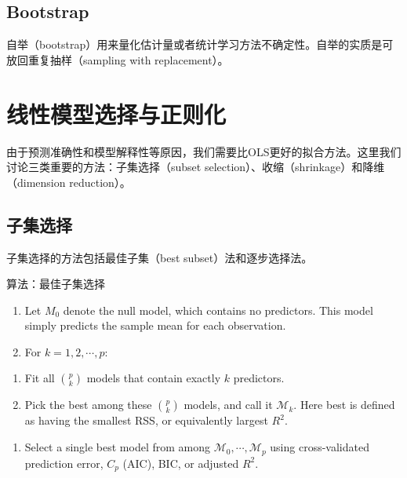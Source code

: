 \documentclass[hyperref,]{ctexart}
\providecommand{\tightlist}{%
  \setlength{\itemsep}{0pt}\setlength{\parskip}{0pt}}
\begin{document}
\subsection{Bootstrap}\label{bootstrap}

自举（bootstrap）用来量化估计量或者统计学习方法不确定性。自举的实质是可放回重复抽样（sampling
with replacement）。

\section{线性模型选择与正则化}

由于预测准确性和模型解释性等原因，我们需要比OLS更好的拟合方法。这里我们讨论三类重要的方法：子集选择（subset
selection）、收缩（shrinkage）和降维（dimension reduction）。

\subsection{子集选择}

子集选择的方法包括最佳子集（best subset）法和逐步选择法。

算法：最佳子集选择

\begin{enumerate}
\def\labelenumi{\arabic{enumi}.}
\tightlist
\item
  Let \(M_0\) denote the null model, which contains no predictors. This
  model simply predicts the sample mean for each observation.
\item
  For \(k=1,2,\cdots,p\):
\end{enumerate}

\begin{enumerate}
\def\labelenumi{\alph{enumi}.}
\tightlist
\item
  Fit all \(\binom{p}{k}\) models that contain exactly \(k\) predictors.
\item
  Pick the best among these \(\binom{p}{k}\) models, and call it
  \(\mathcal{M}_k\). Here best is defined as having the smallest RSS, or
  equivalently largest \(R^2\).
\end{enumerate}

\begin{enumerate}
\def\labelenumi{\arabic{enumi}.}
\setcounter{enumi}{2}
\tightlist
\item
  Select a single best model from among
  \(\mathcal{M}_0, \cdots, \mathcal{M}_p\) using cross-validated
  prediction error, \(C_p\) (AIC), BIC, or adjusted \(R^2\).
\end{enumerate}
\end{document}
